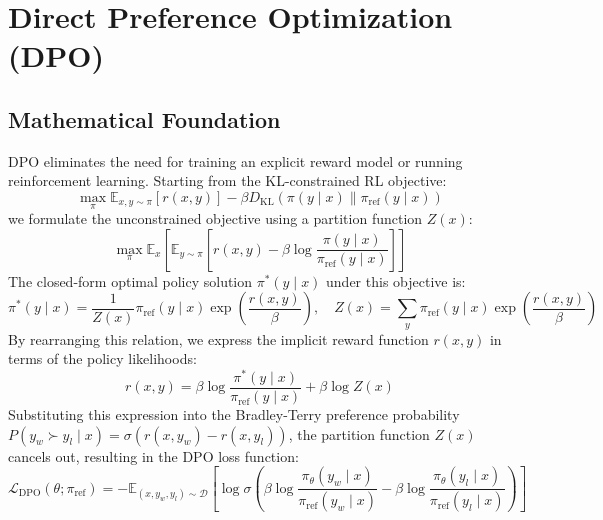 \newpage
\section{Direct Preference Optimization (DPO)}

\subsection{Mathematical Foundation}
DPO eliminates the need for training an explicit reward model or running reinforcement learning. Starting from the KL-constrained RL objective:
\begin{equation}
  \max_{\pi} \mathbb{E}_{x, y \sim \pi} \left[ r(x, y) \right] - \beta D_{\text{KL}}(\pi(y \mid x) \parallel \pi_{\text{ref}}(y \mid x))
\end{equation}
we formulate the unconstrained objective using a partition function $Z(x)$:
\begin{equation}
  \max_{\pi} \mathbb{E}_{x} \left[ \mathbb{E}_{y \sim \pi} \left[ r(x, y) - \beta \log \frac{\pi(y \mid x)}{\pi_{\text{ref}}(y \mid x)} \right] \right]
\end{equation}
The closed-form optimal policy solution $\pi^*(y \mid x)$ under this objective is:
\begin{equation}
  \pi^*(y \mid x) = \frac{1}{Z(x)} \pi_{\text{ref}}(y \mid x) \exp\left( \frac{r(x, y)}{\beta} \right), \quad Z(x) = \sum_{y} \pi_{\text{ref}}(y \mid x) \exp\left( \frac{r(x, y)}{\beta} \right)
\end{equation}
By rearranging this relation, we express the implicit reward function $r(x, y)$ in terms of the policy likelihoods:
\begin{equation}
  r(x, y) = \beta \log \frac{\pi^*(y \mid x)}{\pi_{\text{ref}}(y \mid x)} + \beta \log Z(x)
\end{equation}
Substituting this expression into the Bradley-Terry preference probability $P(y_w \succ y_l \mid x) = \sigma(r(x, y_w) - r(x, y_l))$, the partition function $Z(x)$ cancels out, resulting in the DPO loss function:
\begin{equation}
  \mathcal{L}_{\text{DPO}}(\theta; \pi_{\text{ref}}) = -\mathbb{E}_{(x, y_w, y_l) \sim \mathcal{D}} \left[ \log \sigma \left( \beta \log \frac{\pi_\theta(y_w \mid x)}{\pi_{\text{ref}}(y_w \mid x)} - \beta \log \frac{\pi_\theta(y_l \mid x)}{\pi_{\text{ref}}(y_l \mid x)} \right) \right]
\end{equation}

